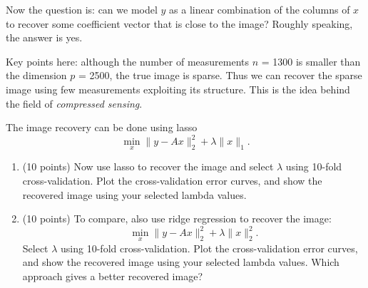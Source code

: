 \documentclass[twoside,10pt]{article}
\begin{document}
Now the question is: can we model $y$ as a linear combination of the columns of $x$ to recover some coefficient vector that is close to the image? Roughly speaking, the answer is yes. 

Key points here: although the number of measurements $n$ = 1300 is smaller than the dimension $p$ = 2500, the true image is sparse. Thus we can recover the sparse image using few measurements exploiting its structure. This is the idea behind the field of \textit{compressed sensing}. 

The image recovery can be done using lasso
\[
\min_x \|y-Ax\|_2^2 + \lambda \|x\|_1.
\]
\begin{enumerate}
\item (10 points) Now use lasso to recover the image and select $\lambda$ using 10-fold cross-validation. Plot the cross-validation error curves, and show the recovered image using your selected lambda values.

\item (10 points) To compare, also use ridge regression to recover the image:
\[
\min_x \|y-Ax\|_2^2 + \lambda \|x\|_2^2.
\]
Select $\lambda$ using 10-fold cross-validation. Plot the cross-validation error curves, and show the recovered image using your selected lambda values. Which approach gives a better recovered image?
\end{enumerate}
\end{document}
